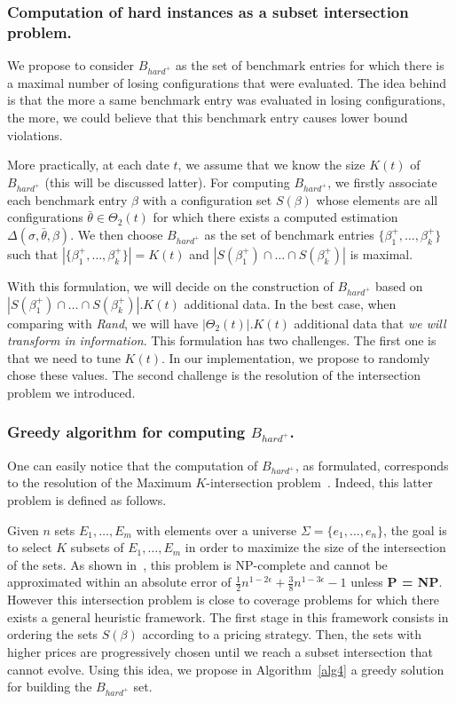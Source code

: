 \documentclass[10pt, conference, compsocconf]{IEEEtran}
\begin{document}
\subsubsection{Computation of hard instances as a subset intersection problem.} 

We propose to consider $B_{hard^+}$ as the set of benchmark entries
for which there is a maximal number of losing configurations that were
evaluated. The idea behind is that the more a same benchmark entry was
evaluated in losing configurations, the more, we could believe that
this benchmark entry causes lower bound violations.

More practically, at each date $t$, we assume that we know the size
$K(t)$ of $B_{hard^+}$ (this will be discussed latter).  For computing
$B_{hard^+}$, we firstly associate each benchmark entry $\beta$ with a
configuration set $S(\beta)$ whose elements are all configurations
$\bar{\theta} \in \Theta_2(t)$ for which there exists a computed
estimation $\Delta(\sigma, \bar{\theta}, \beta)$. We then choose
$B_{hard^+}$ as the set of benchmark entries
$\{ \beta^+_1, \dots, \beta^+_k \}$ such that
$|\{ \beta^+_1, \dots, \beta^+_k \}| = K(t)$ and
$|S(\beta^+_1) \cap \dots \cap S(\beta^+_k)|$ is maximal.


With this formulation, we will decide on the construction of
$B_{hard^+}$ based on
$|S(\beta^+_1) \cap \dots \cap S(\beta^+_k)|.K(t)$ additional data. In
the best case, when comparing with {\it Rand}, we will have
$|\Theta_2(t)|.K(t)$ additional data that {\it we will transform in
  information}.  This formulation has two challenges. The first one is
that we need to tune $K(t)$. In our implementation, we propose to
randomly chose these values. The second challenge is the resolution of
the intersection problem we introduced.

\subsubsection{ Greedy algorithm for computing $B_{hard^+}$.}

One can easily notice that the computation of $B_{hard^+}$, as
formulated, corresponds to the resolution of the Maximum $K$-intersection
problem~\cite{DBLP:journals/ipl/ShiehTY12}.  Indeed, this latter
problem is defined as follows.

Given $n$ sets $E_1,\dots,E_m$ with elements over a universe
$\Sigma = \{ e_1,\dots,e_n  \}$, the goal is to select $K$ subsets of
$E_1,\dots,E_m$ in order to maximize the size of the intersection of
the sets.  As shown in~\cite{DBLP:journals/ipl/ShiehTY12}, this
problem is NP-complete and cannot be approximated within an absolute
error of $\frac{1}{2}n^{1-2\epsilon} + \frac{3}{8}n^{1-3\epsilon} - 1$
unless {\bf P = NP}.  However this intersection problem is close to
coverage problems for which there exists a general heuristic
framework. The first stage in this framework consists in ordering the
sets $S(\beta)$ according to a pricing strategy. Then, the sets with
higher prices are progressively chosen until we reach a subset
intersection that cannot evolve. Using this idea, we propose in
Algorithm~\ref{alg4} a greedy solution for building the $B_{hard^+}$
set.
\end{document}
